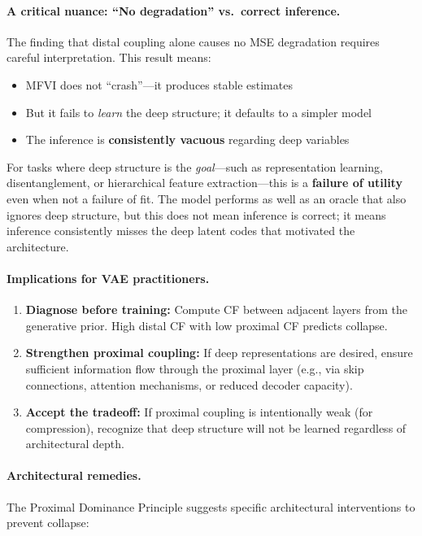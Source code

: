 \documentclass[10pt]{article} %
\theoremstyle{plain}
\theoremstyle{definition}
\begin{document}
\paragraph{A critical nuance: ``No degradation'' vs.\ correct inference.} The finding that distal coupling alone causes no MSE degradation requires careful interpretation. This result means:
\begin{itemize}
    \item MFVI does not ``crash''---it produces stable estimates
    \item But it fails to \emph{learn} the deep structure; it defaults to a simpler model
    \item The inference is \textbf{consistently vacuous} regarding deep variables
\end{itemize}

\noindent For tasks where deep structure is the \emph{goal}---such as representation learning, disentanglement, or hierarchical feature extraction---this is a \textbf{failure of utility} even when not a failure of fit. The model performs as well as an oracle that also ignores deep structure, but this does not mean inference is correct; it means inference consistently misses the deep latent codes that motivated the architecture.

\paragraph{Implications for VAE practitioners.}
\begin{enumerate}
    \item \textbf{Diagnose before training:} Compute CF between adjacent layers from the generative prior. High distal CF with low proximal CF predicts collapse.
    \item \textbf{Strengthen proximal coupling:} If deep representations are desired, ensure sufficient information flow through the proximal layer (e.g., via skip connections, attention mechanisms, or reduced decoder capacity).
    \item \textbf{Accept the tradeoff:} If proximal coupling is intentionally weak (for compression), recognize that deep structure will not be learned regardless of architectural depth.
\end{enumerate}

\paragraph{Architectural remedies.} The Proximal Dominance Principle suggests specific architectural interventions to prevent collapse:
\end{document}
